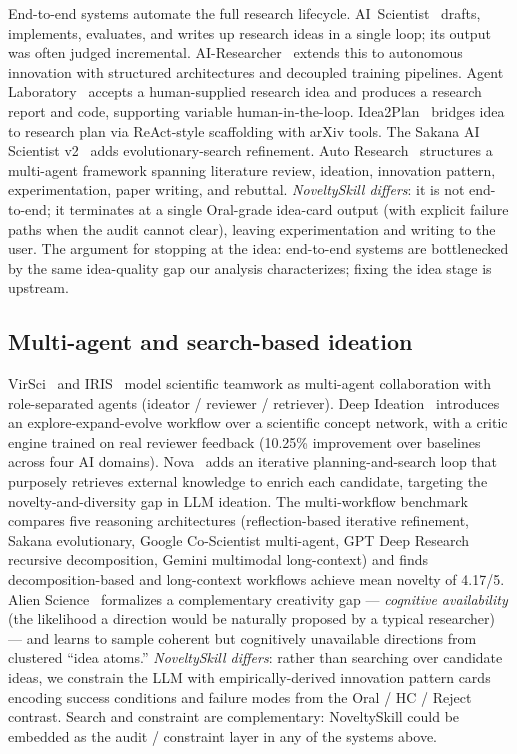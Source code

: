 \documentclass[10pt,a4paper]{article}
\begin{document}
End-to-end systems automate the full research lifecycle. AI~Scientist~\cite{lu2024aiscientist} drafts, implements, evaluates, and writes up research ideas in a single loop; its output was often judged incremental. AI-Researcher~\cite{airesearcher2025} extends this to autonomous innovation with structured architectures and decoupled training pipelines. Agent Laboratory~\cite{agentlab2025} accepts a human-supplied research idea and produces a research report and code, supporting variable human-in-the-loop. Idea2Plan~\cite{idea2plan2025} bridges idea to research plan via ReAct-style scaffolding with arXiv tools. The Sakana AI Scientist v2~\cite{sakana_v2} adds evolutionary-search refinement. Auto Research~\cite{autoresearch2025} structures a multi-agent framework spanning literature review, ideation, innovation pattern, experimentation, paper writing, and rebuttal. \emph{NoveltySkill differs}: it is not end-to-end; it terminates at a single Oral-grade idea-card output (with explicit failure paths when the audit cannot clear), leaving experimentation and writing to the user. The argument for stopping at the idea: end-to-end systems are bottlenecked by the same idea-quality gap our analysis characterizes; fixing the idea stage is upstream.

\subsection{Multi-agent and search-based ideation}
\label{subsec:related-multiagent}

VirSci~\cite{virsci2024} and IRIS~\cite{iris2025} model scientific teamwork as multi-agent collaboration with role-separated agents (ideator / reviewer / retriever). Deep Ideation~\cite{deepideation2025} introduces an explore-expand-evolve workflow over a scientific concept network, with a critic engine trained on real reviewer feedback (10.25\% improvement over baselines across four AI domains). Nova~\cite{nova2024} adds an iterative planning-and-search loop that purposely retrieves external knowledge to enrich each candidate, targeting the novelty-and-diversity gap in LLM ideation. The multi-workflow benchmark~\cite{multiworkflow2026} compares five reasoning architectures (reflection-based iterative refinement, Sakana evolutionary, Google Co-Scientist multi-agent, GPT Deep Research recursive decomposition, Gemini multimodal long-context) and finds decomposition-based and long-context workflows achieve mean novelty of 4.17/5. Alien Science~\cite{alienscience2026} formalizes a complementary creativity gap --- \emph{cognitive availability} (the likelihood a direction would be naturally proposed by a typical researcher) --- and learns to sample coherent but cognitively unavailable directions from clustered ``idea atoms.'' \emph{NoveltySkill differs}: rather than searching over candidate ideas, we constrain the LLM with empirically-derived innovation pattern cards encoding success conditions and failure modes from the Oral / HC / Reject contrast. Search and constraint are complementary: NoveltySkill could be embedded as the audit / constraint layer in any of the systems above.
\end{document}
